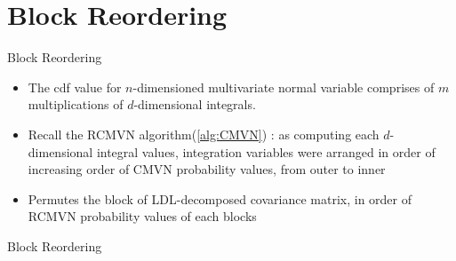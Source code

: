 \section{Block Reordering}

\begin{frame}{Block Reordering}
\footnotesize
\begin{itemize}
	\item The cdf value for $n$-dimensioned multivariate normal variable comprises of $m$ multiplications of $d$-dimensional integrals.
	\item Recall the RCMVN algorithm(\ref{alg:CMVN}) : as computing each $d$-dimensional integral values, integration variables were arranged in order of increasing order of CMVN probability values, from outer to inner
	\item Permutes the block of LDL-decomposed covariance matrix, in order of RCMVN probability values of each blocks
\end{itemize}
\end{frame}

\begin{frame}{Block Reordering}
\end{frame}
